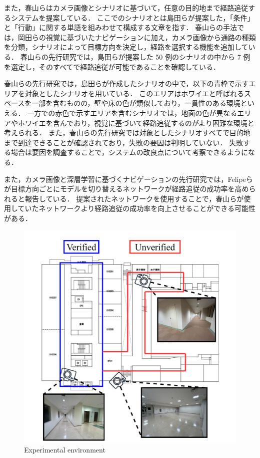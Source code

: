 また，春山ら\cite{haruyama2023}はカメラ画像とシナリオに基づいて，任意の目的地まで経路追従するシステムを提案している．
ここでのシナリオとは島田ら\cite{shimada2020}が提案した，「条件」と「行動」に関する単語を組みわせて構成する文章を指す．
春山らの手法では，岡田らの視覚に基づいたナビゲーションに加え，カメラ画像から通路の種類を分類，シナリオによって目標方向を決定し，経路を選択する機能を追加している．
春山らの先行研究では，島田らが提案した 50 例のシナリオの中から 7 例を選定し，そのすべてで経路追従が可能であることを確認している．

春山らの先行研究では，島田らが作成したシナリオの中で，以下の青枠で示すエリアを対象としたシナリオを用いている．
このエリアはホワイエと呼ばれるスペースを一部を含むものの，壁や床の色が類似しており，一貫性のある環境といえる．
一方での赤色で示すエリアを含むシナリオでは，地面の色が異なるエリアやホワイエを含んでおり，視覚に基づいて経路追従するのがより困難な環境と考えられる．
また，春山らの先行研究では対象としたシナリオすべてで目的地まで到達できることが確認されており，失敗の要因は判明していない．
失敗する場合は要因を調査することで，システムの改良点について考察できるようになる．

また，カメラ画像と深層学習に基づくナビゲーションの先行研究では，Felipeらが目標方向ごとにモデルを切り替えるネットワークが経路追従の成功率を高められると報告している．
提案されたネットワークを使用することで，春山らが使用していたネットワークより経路追従の成功率を向上させることができる可能性がある．

\begin{figure}[htbp]
     \centering
     \includegraphics[width=130mm]{images/pdf/ishiguro/cit3f.pdf}
     \caption{Experimental environment}
     \label{fig:cit3f}
\end{figure}

\newpage

